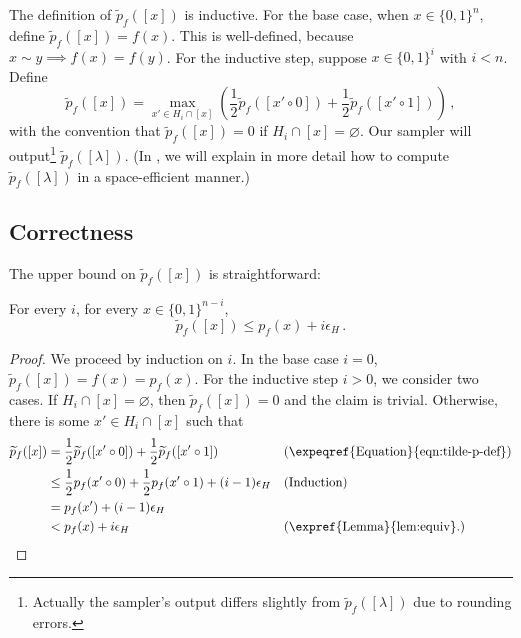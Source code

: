 The definition of $\widetilde{p}_f([x])$ is inductive. For the base case, when $x \in \{0, 1\}^n$, define $\widetilde{p}_f([x]) = f(x)$. This is well-defined, because $x \sim y \implies f(x) = f(y)$. For the inductive step, suppose $x \in \{0, 1\}^i$ with $i < n$. Define
\begin{equation} \label{eqn:tilde-p-def}
\widetilde{p}_f([x]) = \max_{x' \in H_i \cap [x]} \left(\frac{1}{2} \widetilde{p}_f([x' \circ 0]) + \frac{1}{2} \widetilde{p}_f([x' \circ 1])\right)\,,
\end{equation}
with the convention that $\widetilde{p}_f([x]) = 0$ if $H_i \cap [x] = \varnothing$. Our sampler will output\footnote{Actually the sampler's output differs slightly from $\widetilde{p}_f([\lambda])$ due to rounding errors.} $\widetilde{p}_f([\lambda])$. (In , we will explain in more detail how to compute $\widetilde{p}_f([\lambda])$ in a space-efficient manner.)

\subsection{Correctness}

The upper bound on $\widetilde{p}_f([x])$ is straightforward:
\begin{claim} \label{clm:const-width-ub}
For every $i$, for every $x \in \{0, 1\}^{n - i}$,
$$
\widetilde{p}_f([x]) \leq p_f(x) + i \epsilon_H\,.
$$
\end{claim}

\begin{proof}
We proceed by induction on $i$. In the base case $i = 0$, $\widetilde{p}_f([x]) = f(x) = p_f(x)$. For the inductive step $i > 0$, we consider two cases. If $H_i \cap [x] = \varnothing$, then $\widetilde{p}_f([x]) = 0$ and the claim is trivial. Otherwise, there is some $x' \in H_i \cap [x]$ such that
\begin{align*}
\widetilde{p}_f([x]) &= \frac{1}{2} \widetilde{p}_f([x' \circ 0]) + \frac{1}{2} \widetilde{p}_f([x' \circ 1]) && (\text{\expeqref{Equation}{eqn:tilde-p-def}}) \\
&\leq \frac{1}{2} p_f(x' \circ 0) + \frac{1}{2} p_f(x' \circ 1) + (i - 1) \epsilon_H && \text{(Induction)} \\
&= p_f(x') + (i - 1) \epsilon_H \\
&< p_f(x) + i \epsilon_H && \text{(\expref{Lemma}{lem:equiv}.)} \qedhere
\end{align*}
\end{proof}

